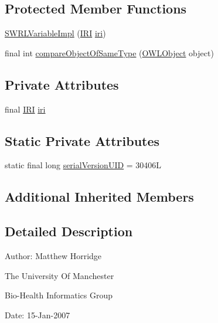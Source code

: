 \subsection*{Protected Member Functions}
\begin{DoxyCompactItemize}
\item 
\hyperlink{classuk_1_1ac_1_1manchester_1_1cs_1_1owl_1_1owlapi_1_1_s_w_r_l_variable_impl_afe22ac65afba42ae92092cfb811da4aa}{S\-W\-R\-L\-Variable\-Impl} (\hyperlink{classorg_1_1semanticweb_1_1owlapi_1_1model_1_1_i_r_i}{I\-R\-I} \hyperlink{classuk_1_1ac_1_1manchester_1_1cs_1_1owl_1_1owlapi_1_1_s_w_r_l_variable_impl_aede8985a4b2f6a014b853ea0145bfe50}{iri})
\item 
final int \hyperlink{classuk_1_1ac_1_1manchester_1_1cs_1_1owl_1_1owlapi_1_1_s_w_r_l_variable_impl_a9c6b0d27ca365cd159b70fdada9804c4}{compare\-Object\-Of\-Same\-Type} (\hyperlink{interfaceorg_1_1semanticweb_1_1owlapi_1_1model_1_1_o_w_l_object}{O\-W\-L\-Object} object)
\end{DoxyCompactItemize}
\subsection*{Private Attributes}
\begin{DoxyCompactItemize}
\item 
final \hyperlink{classorg_1_1semanticweb_1_1owlapi_1_1model_1_1_i_r_i}{I\-R\-I} \hyperlink{classuk_1_1ac_1_1manchester_1_1cs_1_1owl_1_1owlapi_1_1_s_w_r_l_variable_impl_aede8985a4b2f6a014b853ea0145bfe50}{iri}
\end{DoxyCompactItemize}
\subsection*{Static Private Attributes}
\begin{DoxyCompactItemize}
\item 
static final long \hyperlink{classuk_1_1ac_1_1manchester_1_1cs_1_1owl_1_1owlapi_1_1_s_w_r_l_variable_impl_a2db52448bcba661148e4fc4fc10a6b65}{serial\-Version\-U\-I\-D} = 30406\-L
\end{DoxyCompactItemize}
\subsection*{Additional Inherited Members}


\subsection{Detailed Description}
Author\-: Matthew Horridge\par
 The University Of Manchester\par
 Bio-\/\-Health Informatics Group\par
 Date\-: 15-\/\-Jan-\/2007\par
\par
 

